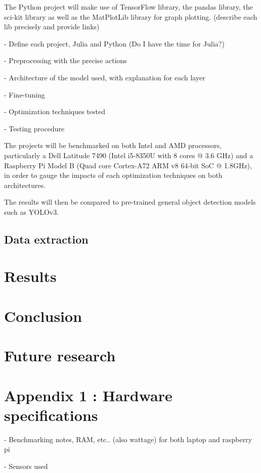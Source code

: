 \documentclass[12pt]{article}
\begin{document}
The Python project will make use of TensorFlow library, the pandas library, the sci-kit library as well as the MatPlotLib library for graph plotting.
(describe each lib precisely and provide links)

- Define each project, Julia and Python (Do I have the time for Julia?)

- Preprocessing with the precise actions

- Architecture of the model used, with explanation for each layer

- Fine-tuning

- Optimization techniques tested

- Testing procedure

The projects will be benchmarked on both Intel and AMD processors, particularly a Dell Latitude 7490 (Intel i5-8350U with 8 cores @ 3.6 GHz) and a Raspberry Pi Model B (Quad core Cortex-A72 ARM v8 64-bit SoC @ 1.8GHz), in order to gauge the impacts of each optimization techniques on both architectures.

The results will then be compared to pre-trained general object detection models such as YOLOv3.

\subsection{Data extraction}

\section{Results}

\section{Conclusion}

\section{Future research}

\section{Appendix 1 : Hardware specifications}

- Benchmarking notes, RAM, etc.. (also wattage) for both laptop and raspberry pi

- Sensors used
\end{document}
